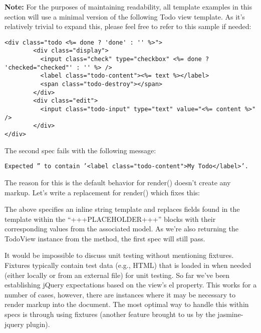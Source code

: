 \documentclass[9pt]{book}
\newenvironment{Shaded}{}{}
\newcommand{\KeywordTok}[1]{\textcolor[rgb]{0.00,0.44,0.13}{\textbf{{#1}}}}
\newcommand{\StringTok}[1]{\textcolor[rgb]{0.25,0.44,0.63}{{#1}}}
\newcommand{\OtherTok}[1]{\textcolor[rgb]{0.00,0.44,0.13}{{#1}}}
\newcommand{\FunctionTok}[1]{\textcolor[rgb]{0.02,0.16,0.49}{{#1}}}
\newcommand{\NormalTok}[1]{{#1}}
\begin{document}
\textbf{Note:} For the purposes of maintaining readability, all template
examples in this section will use a minimal version of the following
Todo view template. As it's relatively trivial to expand this, please
feel free to refer to this sample if needed:

\begin{verbatim}
<div class="todo <%= done ? 'done' : '' %>">
        <div class="display">
          <input class="check" type="checkbox" <%= done ? 'checked="checked"' : '' %> />
          <label class="todo-content"><%= text %></label>
          <span class="todo-destroy"></span>
        </div>
        <div class="edit">
          <input class="todo-input" type="text" value="<%= content %>" />
        </div>
</div>
\end{verbatim}

The second spec fails with the following message:

\texttt{Expected '' to contain '\textless{}label class="todo-content"\textgreater{}My Todo\textless{}/label\textgreater{}'.}

The reason for this is the default behavior for render() doesn't create
any markup. Let's write a replacement for render() which fixes this:

\begin{Shaded}
\end{Shaded}

The above specifies an inline string template and replaces fields found
in the template within the ``+++PLACEHOLDER+++'' blocks with their
corresponding values from the associated model. As we're also returning
the TodoView instance from the method, the first spec will still pass.

It would be impossible to discuss unit testing without mentioning
fixtures. Fixtures typically contain test data (e.g., HTML) that is
loaded in when needed (either locally or from an external file) for unit
testing. So far we've been establishing jQuery expectations based on the
view's el property. This works for a number of cases, however, there are
instances where it may be necessary to render markup into the document.
The most optimal way to handle this within specs is through using
fixtures (another feature brought to us by the jasmine-jquery plugin).
\end{document}
